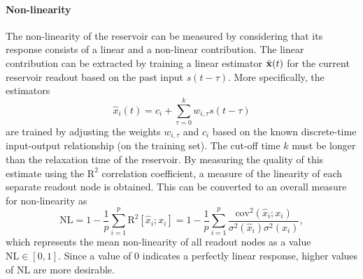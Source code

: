 \paragraph{Non-linearity}
The non-linearity of the reservoir can be measured by considering that its response consists of a linear and a non-linear contribution.
The linear contribution can be extracted by training a linear estimator $\hat{\boldsymbol{\mathbf{x}}}(t)$ for the current reservoir readout based on the past input $s(t - \tau)$.
More specifically, the estimators
\begin{equation}
	\hat{x}_i(t) = c_i + \sum_{\tau=0}^{k} w_{i,\tau} s(t - \tau)
\end{equation}
are trained by adjusting the weights $w_{i,\tau}$ and $c_i$ based on the known discrete-time input-output relationship (on the training set).
The cut-off time $k$ must be longer than the relaxation time of the reservoir.
By measuring the quality of this estimate using the $\mathrm{R}^2$ correlation coefficient, a measure of the linearity of each separate readout node is obtained.
This can be converted to an overall measure for non-linearity as
\begin{equation}
	\mathrm{NL} = 1 - \frac{1}{p} \sum_{i=1}^p \mathrm{R}^2[\hat{x}_i;x_i] = 1 - \frac{1}{p} \sum_{i=1}^p \frac{\mathrm{cov}^2(\hat{x}_i; x_i)}{\sigma^2(\hat{x}_i) \sigma^2(x_i)} \mathrm{,}
\end{equation}
which represents the mean non-linearity of all readout nodes as a value $\mathrm{NL} \in [0,1]$.
Since a value of 0 indicates a perfectly linear response, higher values of NL are more desirable.

